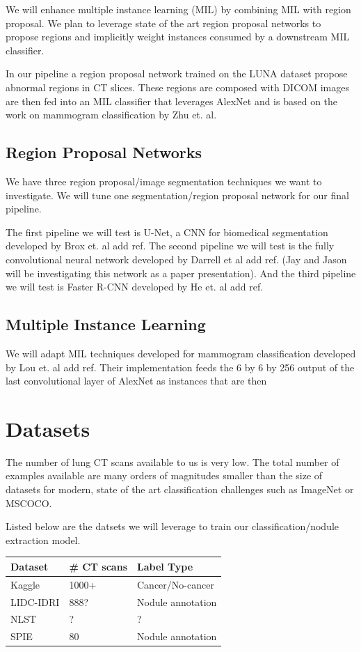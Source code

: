 \documentclass[twocolumn,10pt]{article}
\newcommand{\red}[1]{{\color{red}#1}}
\begin{document}
We will enhance multiple instance learning (MIL) by combining
MIL with region proposal. We plan to leverage state of the 
art region proposal networks to propose regions and implicitly weight instances 
consumed by a downstream MIL classifier.

In our pipeline a region proposal network trained on the LUNA dataset propose
abnormal regions in CT slices. These regions are composed with 
DICOM images are then fed into an MIL classifier that leverages AlexNet and 
is based on the work on mammogram classification by Zhu et. al.

\subsection{Region Proposal Networks}
We have three region proposal/image segmentation techniques we want to investigate.
We will tune one segmentation/region proposal network for our final pipeline. 

The first pipeline we will test is U-Net, a CNN for biomedical
segmentation developed by Brox et. al \red{add ref}. The second pipeline we will test
is the fully convolutional neural network developed by Darrell et al \red{add ref}.
(Jay and Jason will be investigating this network as a paper presentation). And
the third pipeline we will test is Faster R-CNN developed by He et. al \red{add ref}.

\subsection{Multiple Instance Learning}
We will adapt MIL techniques developed for mammogram classification developed by
Lou et. al \red{add ref}. Their implementation feeds the 6 by 6 by 256 output of the last
convolutional layer of AlexNet as instances that are then 

\section{Datasets}
The number of lung CT scans available to us is very low. The total number of examples
available are many orders of magnitudes smaller than the size of datasets for modern,
state of the art classification challenges such as ImageNet or MSCOCO. 

Listed below are the datsets we will leverage to train our classification/nodule
extraction model.

\begin{center}
\begin{tabular}{lll}
  \toprule
  Dataset & \# CT scans & Label Type\\
  \midrule
  Kaggle&1000+&Cancer/No-cancer\\
  LIDC-IDRI&888?&Nodule annotation\\
  NLST&?&?\\
  SPIE&80&Nodule annotation\\
\end{tabular}
\end{center}
\end{document}
